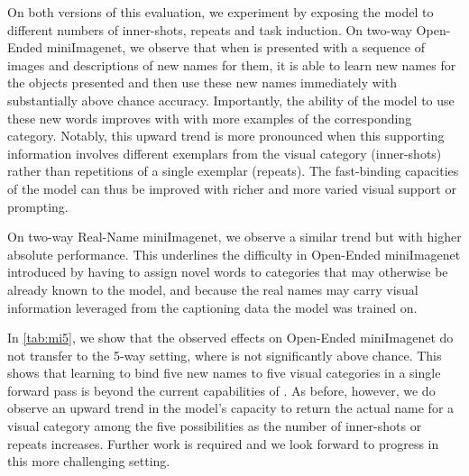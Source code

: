 On both versions of this evaluation, we experiment by exposing the model to different numbers of inner-shots, repeats and task induction. On two-way Open-Ended miniImagenet, we observe that when \Model is presented with a sequence of images and descriptions of new names for them, it is able to learn new names for the objects presented and then use these new names immediately with substantially above chance accuracy. Importantly, the ability of the model to use these new words improves with with more examples of the corresponding category. Notably, this upward trend is more pronounced when this supporting information involves different exemplars from the visual category (inner-shots) rather than repetitions of a single exemplar (repeats). The fast-binding capacities of the model can thus be improved with richer and more varied visual support or prompting.

On two-way Real-Name miniImagenet, we observe a similar trend but with higher absolute performance. This underlines the difficulty in Open-Ended miniImagenet introduced by having to assign novel words to categories that may otherwise be already known to the model, and because the real names may carry visual information leveraged from the captioning data the model was trained on. 

In \autoref{tab:mi5}, we show that the observed effects on Open-Ended miniImagenet do not transfer to the 5-way setting, where \Model is not significantly above chance. This shows that learning to bind five new names to five visual categories in a single forward pass is beyond the current capabilities of \Model. As before, however, we do observe an upward trend in the model's capacity to return the actual name for a visual category among the five possibilities as the number of inner-shots or repeats increases. Further work is required and we look forward to progress in this more challenging setting.

